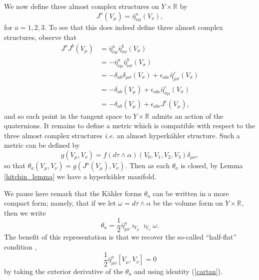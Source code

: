 \documentclass[a4paper,onecolumn,12pt]{article}
\theoremstyle{definition}
\theoremstyle{remark}
\newcommand{\ie}{\emph{i.e.} }
\newcommand{\al}{\alpha}
\newcommand{\m}{\mu}
\newcommand{\n}{\nu}
\newcommand{\tta}[1]{\theta_{#1}}
\newcommand{\K}{K\"ahler }
\newcommand{\HK}{hyperk\"ahler }
\newcommand{\R}{\mathbb{R}}
\newcommand{\hooft}[3]{\bar{\eta}^{#1}_{#2 #3}}
\begin{document}
We now define three almost complex structures on $Y\times\R$ by
\begin{equation}
	J^{a}(V_{\m}) = \hooft{a}{\n}{\m}(V_{\n}),
\end{equation}
for $a=1,2,3.$ To see that this does indeed define three almost complex structures, observe that
\begin{align*}
	J^{a}J^{b}(V_{\m}) &= \hooft{a}{\n}{\m}\hooft{b}{\sigma}{\n}(V_{\sigma})\\
	&=-\hooft{a}{\n}{\m}\hooft{b}{\n}{\sigma}(V_{\sigma})\\
	&=-\delta_{ab}\delta_{\m\sigma}(V_{\sigma}) + \epsilon_{abc}\bar{\eta}^{c}_{\m \sigma}(V_{\sigma})\\
	&=-\delta_{ab}(V_{\m}) + \epsilon_{abc}\bar{\eta}^{c}_{\sigma \m}(V_{\sigma})\\
	&=-\delta_{ab}(V_{\m}) + \epsilon_{abc}J^{c}(V_{\m}),
\end{align*}
and so each point in the tangent space to $Y\times\R$ admits an action of the quaternions.
It remains to define a metric which is compatible with respect to the three almost complex structures \ie an almost \HK structure. Such a metric can be defined by 
\begin{equation}
	g(V_{\m},V_{\n}) = f(d\tau\wedge\al)(V_{0},V_{1},V_{2},V_{3})\delta_{\m\n},
\end{equation}
so that $\tta{a}(V_{\m},V_{\n}) = g(J^{a}(V_{\m}),V_{\n}).$ Then as each $\tta{a}$ is closed, by Lemma \ref{hitchin_lemma} we have a \HK manifold.

We pause here remark that the \K forms $\tta{a}$ can be written in a more compact form; namely, that if we let $\omega = d\tau\wedge\alpha$ be the volume form on $Y\times\R,$ then we  write
\begin{equation}
	\tta{a} = \frac{1}{2}\hooft{a}{\m}{\n}\imath_{V_{\m}}\imath_{V_{\n}}\omega.
\end{equation}
The benefit of this representation is that we recover the so-called ``half-flat'' condition \cite{ashtekar_1988, hashimoto_1997}, 
\begin{equation}
\label{half_flat}
	\frac{1}{2}\hooft{a}{\m}{\n}[V_{\m},V_{\n}] = 0
\end{equation}
by taking the exterior derivative of the $\tta{a}$ and using identity (\ref{cartan}). 
\end{document}
